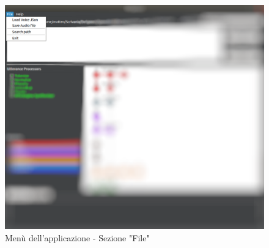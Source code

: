 \documentclass[openany,12pt,a4paper]{report}
\begin{document}
 		\begin{figure}[H]
 			
 			\centering
 			
 			\includegraphics[scale=0.3]{./img/file}
 			
 			\caption{Menù dell'applicazione - Sezione "File"}
 			
 		\end{figure}
 	
 	\newpage
 	
\end{document}
